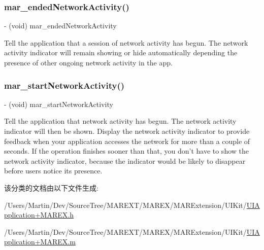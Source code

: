 \subsubsection{\texorpdfstring{mar\+\_\+ended\+Network\+Activity()}{mar\_endedNetworkActivity()}}
{\footnotesize\ttfamily -\/ (void) mar\+\_\+ended\+Network\+Activity \begin{DoxyParamCaption}{ }\end{DoxyParamCaption}}



Tell the application that a session of network activity has begun. The network activity indicator will remain showing or hide automatically depending the presence of other ongoing network activity in the app. 

\mbox{\label{category_u_i_application_07_m_a_r_e_x___network_activity_indicator_08_ab6ec23eb9259c04ae15dd57d644ae229}} 
\subsubsection{\texorpdfstring{mar\+\_\+start\+Network\+Activity()}{mar\_startNetworkActivity()}}
{\footnotesize\ttfamily -\/ (void) mar\+\_\+start\+Network\+Activity \begin{DoxyParamCaption}{ }\end{DoxyParamCaption}}

Tell the application that network activity has begun. The network activity indicator will then be shown. Display the network activity indicator to provide feedback when your application accesses the network for more than a couple of seconds. If the operation finishes sooner than that, you don’t have to show the network activity indicator, because the indicator would be likely to disappear before users notice its presence. 

该分类的文档由以下文件生成\+:\begin{DoxyCompactItemize}
\item 
/\+Users/\+Martin/\+Dev/\+Source\+Tree/\+M\+A\+R\+E\+X\+T/\+M\+A\+R\+E\+X/\+M\+A\+R\+Extension/\+U\+I\+Kit/\hyperlink{_u_i_application_09_m_a_r_e_x_8h}{U\+I\+Application+\+M\+A\+R\+E\+X.\+h}\item 
/\+Users/\+Martin/\+Dev/\+Source\+Tree/\+M\+A\+R\+E\+X\+T/\+M\+A\+R\+E\+X/\+M\+A\+R\+Extension/\+U\+I\+Kit/\hyperlink{_u_i_application_09_m_a_r_e_x_8m}{U\+I\+Application+\+M\+A\+R\+E\+X.\+m}\end{DoxyCompactItemize}
